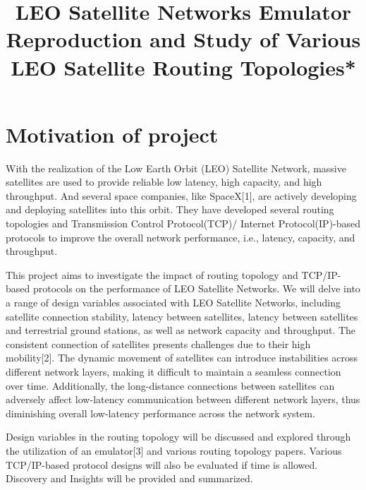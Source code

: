 \documentclass[conference]{IEEEtran}
\begin{document}
\title{LEO Satellite Networks Emulator Reproduction and Study of Various LEO Satellite Routing Topologies*\\


}

\author{

}

\maketitle

\section{Motivation of project}
With the realization of the Low Earth Orbit (LEO) Satellite Network, massive satellites are used to provide reliable low latency, high capacity, and high throughput. And several space companies, like SpaceX[1], are actively developing and deploying satellites into this orbit. They have developed several routing topologies and Transmission Control Protocol(TCP)/ Internet Protocol(IP)-based protocols to improve the overall network performance, i.e., latency, capacity, and throughput.	

This project aims to investigate the impact of routing topology and TCP/IP-based protocols on the performance of LEO Satellite Networks. We will delve into a range of design variables associated with LEO Satellite Networks, including satellite connection stability, latency between satellites, latency between satellites and terrestrial ground stations, as well as network capacity and throughput. The consistent connection of satellites presents challenges due to their high mobility[2]. The dynamic movement of satellites can introduce instabilities across different network layers, making it difficult to maintain a seamless connection over time. Additionally, the long-distance connections between satellites can adversely affect low-latency communication between different network layers, thus diminishing overall low-latency performance across the network system.

Design variables in the routing topology will be discussed and explored through the utilization of an emulator[3] and various routing topology papers. Various TCP/IP-based protocol designs will also be evaluated if time is allowed. Discovery and Insights will be provided and summarized.
\end{document}

